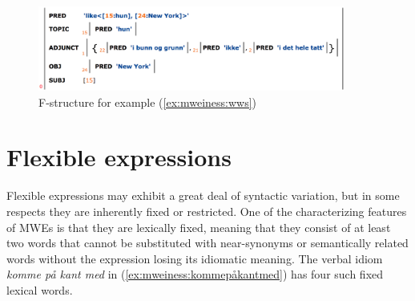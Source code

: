 \documentclass[output=paper]{langsci/langscibook}
\begin{document}
\begin{figure}
  \includegraphics[width=0.9\textwidth]{figures/wws-fstr}
  \caption{F-structure for example (\ref{ex:mweiness:wws})}
  \label{fig:mweiness:wws-fstr}
\end{figure}


%
%
%
%
%
%
%


\section{Flexible expressions}\label{sec:mweiness:flexexp}

Flexible expressions may exhibit a great deal of syntactic variation, but in some respects they are inherently fixed or restricted.
One of the characterizing features of MWEs is that they are lexically fixed, meaning that they consist of at least two words that cannot be substituted with near-synonyms or semantically related words without the expression losing its idiomatic meaning. 
The verbal idiom \emph{komme på kant med} in (\ref{ex:mweiness:kommepåkantmed}) has four such fixed lexical words.
\end{document}
